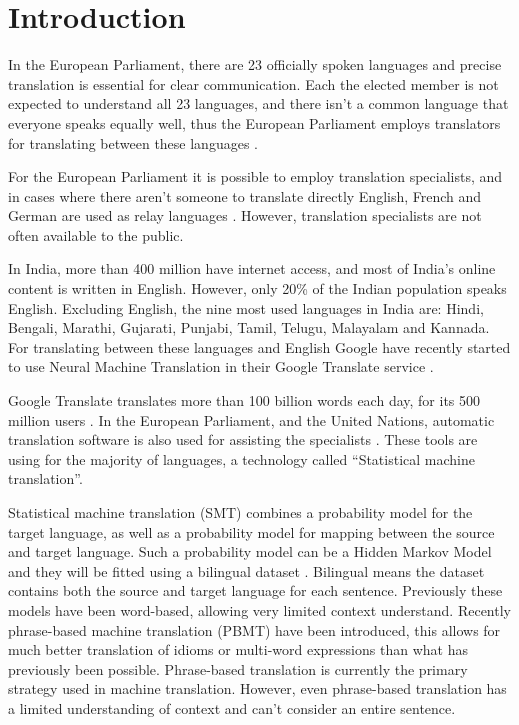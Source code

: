 \chapter{Introduction}

In the European Parliament, there are 23 officially spoken languages and precise translation is essential for clear communication. Each the elected member is not expected to understand all 23 languages, and there isn't a common language that everyone speaks equally well, thus the European Parliament employs translators for translating between these languages \cite{europarl-translation}.

For the European Parliament it is possible to employ translation specialists, and in cases where there aren't someone to translate directly English, French and German are used as relay languages \cite{europarl-translation}. However, translation specialists are not often available to the public.

In India, more than 400 million have internet access, and most of India’s online content is written in English. However, only 20\% of the Indian population speaks English. Excluding English, the nine most used languages in India are: Hindi, Bengali, Marathi, Gujarati, Punjabi, Tamil, Telugu, Malayalam and Kannada. For translating between these languages and English Google have recently started to use Neural Machine Translation in their Google Translate service \cite{google-translate-india}.

Google Translate translates more than 100 billion words each day, for its 500 million users \cite{google-translate-stats}. In the European Parliament, and the United Nations, automatic translation software is also used for assisting the specialists \cite{europarl-translation}. These tools are using for the majority of languages, a technology called ``Statistical machine translation''.

Statistical machine translation (SMT) combines a probability model for the target language, as well as a probability model for mapping between the source and target language. Such a probability model can be a Hidden Markov Model and they will be fitted using a bilingual dataset \cite{smt-comparetive-study}. Bilingual means the dataset contains both the source and target language for each sentence. Previously these models have been word-based, allowing very limited context understand. Recently phrase-based machine translation (PBMT) have been introduced, this allows for much better translation of idioms or multi-word expressions than what has previously been possible. Phrase-based translation is currently the primary strategy used in machine translation. However, even phrase-based translation has a limited understanding of context and can't consider an entire sentence.

